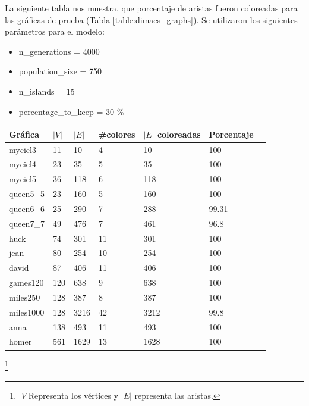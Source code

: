 \documentclass{article}
\begin{document}
La siguiente tabla nos muestra, que porcentaje de aristas fueron coloreadas para las gráficas de prueba (Tabla \ref{table:dimacs_graphs}). Se utilizaron los siguientes parámetros para el modelo:
\begin{itemize}
    \item n\_generations = 4000 
    \item population\_size = 750
    \item n\_islands = 15
    \item percentage\_to\_keep = 30 \%
\end{itemize}
\begin{table}[H]
\centering
\begin{tabular}{|l|l|l|l|l|l|l|}
\hline
Gráfica      & $|V|$  & $|E|$  & #colores   & $|E|$ coloreadas  & Porcentaje    \\ \hline
myciel3     & 11     & 10     &  4         &   10                & 100               \\ \hline
myciel4    &  23    &  35    &5           &   35                & 100           \\ \hline
myciel5  & 36  & 118 & 6                   &  118                 &    100         \\ \hline
queen5\_5  & 23     & 160    &  5         & 160               & 100  \\ \hline
queen6\_6 & 25 & 290 &  7                 & 288               & 99.31  \\ \hline
queen7\_7 &49  & 476  & 7                  &  461              & 96.8       \\ \hline
huck & 74 & 301 & 11                       &   301                &    100         \\ \hline
jean& 80 & 254 & 10                        &254                   &100             \\ \hline
david& 87 & 406 & 11                      & 406               &  100 \\ \hline
games120 &120  &638  & 9                  &  638                 &100        \\ \hline
miles250& 128 & 387 & 8                   &  387                 & 100            \\ \hline
miles1000 &  128 & 3216 & 42              & 3212              &  99.8 \\ \hline
anna& 138 & 493 & 11                       &  493                 &  100           \\ \hline
homer & 561 & 1629 & 13                    &1628                   &100             \\ \hline
\end{tabular}
\end{table}
\footnote{$|V| $Representa los vértices y $|E|$ representa las aristas.}
\end{document}
